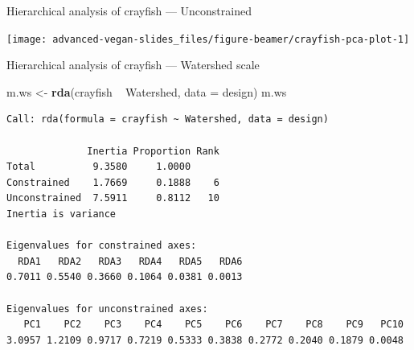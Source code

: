 \documentclass[10pt,ignorenonframetext,compress, aspectratio=169]{beamer}
\newenvironment{Shaded}{\begin{snugshade}}{\end{snugshade}}
\newcommand{\KeywordTok}[1]{\textcolor[rgb]{0.13,0.29,0.53}{\textbf{{#1}}}}
\newcommand{\DataTypeTok}[1]{\textcolor[rgb]{0.13,0.29,0.53}{{#1}}}
\newcommand{\DecValTok}[1]{\textcolor[rgb]{0.00,0.00,0.81}{{#1}}}
\newcommand{\StringTok}[1]{\textcolor[rgb]{0.31,0.60,0.02}{{#1}}}
\newcommand{\OtherTok}[1]{\textcolor[rgb]{0.56,0.35,0.01}{{#1}}}
\newcommand{\NormalTok}[1]{{#1}}
\begin{document}
\begin{frame}[fragile]{Hierarchical analysis of crayfish ---
Unconstrained}

\scriptsize

\begin{Shaded}
\end{Shaded}

\begin{center}\texttt{[image: advanced-vegan-slides\_files/figure-beamer/crayfish-pca-plot-1]} \end{center}

\normalsize

\end{frame}

\begin{frame}[fragile]{Hierarchical analysis of crayfish --- Watershed
scale}

\scriptsize

\begin{Shaded}
\begin{Highlighting}[]
\NormalTok{m.ws <-}\StringTok{ }\KeywordTok{rda}\NormalTok{(crayfish ~}\StringTok{ }\NormalTok{Watershed, }\DataTypeTok{data =} \NormalTok{design)}
\NormalTok{m.ws}
\end{Highlighting}
\end{Shaded}

\begin{verbatim}
Call: rda(formula = crayfish ~ Watershed, data = design)

              Inertia Proportion Rank
Total          9.3580     1.0000     
Constrained    1.7669     0.1888    6
Unconstrained  7.5911     0.8112   10
Inertia is variance 

Eigenvalues for constrained axes:
  RDA1   RDA2   RDA3   RDA4   RDA5   RDA6 
0.7011 0.5540 0.3660 0.1064 0.0381 0.0013 

Eigenvalues for unconstrained axes:
   PC1    PC2    PC3    PC4    PC5    PC6    PC7    PC8    PC9   PC10 
3.0957 1.2109 0.9717 0.7219 0.5333 0.3838 0.2772 0.2040 0.1879 0.0048 
\end{verbatim}

\normalsize

\end{frame}
\end{document}
